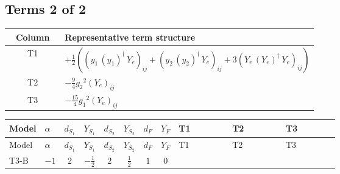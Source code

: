 \documentclass[8pt]{article}
\begin{document}
\begin{landscape}
\subsection*{Terms 2 of 2}
\begin{center}
\begin{tabular}{@{}c >{\raggedright\arraybackslash}p{0.82\linewidth}@{}}
\toprule
Column & Representative term structure \\
\midrule
T1 & \(\displaystyle +\frac{1}{2} (\left({y_1}\,\left({y_1}\right)^{\dagger}\,{Y_e}\right)_{ij}+\left({y_2}\,\left({y_2}\right)^{\dagger}\,{Y_e}\right)_{ij}+3 \left({Y_e}\,\left({Y_e}\right)^{\dagger}\,{Y_e}\right)_{ij})\) \\
\midrule
T2 & \(\displaystyle -\frac{9}{4} {g_2}^2 \left({Y_e}\right)_{ij}\) \\
\midrule
T3 & \(\displaystyle -\frac{15}{4} {g_1}^2 \left({Y_e}\right)_{ij}\) \\
\midrule
\bottomrule
\end{tabular}
\end{center}
\smallskip
\tiny
\begin{longtable}{@{}llcccccc >{\raggedright\arraybackslash}p{0.21\linewidth} >{\raggedright\arraybackslash}p{0.21\linewidth} >{\raggedright\arraybackslash}p{0.21\linewidth}@{}}
\toprule
Model & $\alpha$ & $d_{S_1}$ & $Y_{S_1}$ & $d_{S_2}$ & $Y_{S_2}$ & $d_F$ & $Y_F$ & T1 & T2 & T3 \\
\midrule
\endfirsthead
\toprule
Model & $\alpha$ & $d_{S_1}$ & $Y_{S_1}$ & $d_{S_2}$ & $Y_{S_2}$ & $d_F$ & $Y_F$ & T1 & T2 & T3 \\
\midrule
\endhead
T3-B & $-1$ & $2$ & $-\frac{1}{2}$ & $2$ & $\frac{1}{2}$ & $1$ & $0$ & \scriptsize\adjustbox{max width=\linewidth}{$\begin{gathered} +\frac{1}{2} (\left({y_1}\,\left({y_1}\right)^{\dagger}\,{Y_e}\right)_{ij}+\left({y_2}\,\left({y_2}\right)^{\dagger}\,{Y_e}\right)_{ij}+3 \left({Y_e}\,\left({Y_e}\right)^{\dagger}\,{Y_e}\right)_{ij})\end{gathered}$} & \scriptsize\adjustbox{max width=\linewidth}{$\begin{gathered} -\frac{9}{4} {g_2}^2 \left({Y_e}\right)_{ij}\end{gathered}$} & \scriptsize\adjustbox{max width=\linewidth}{$\begin{gathered} -\frac{15}{4} {g_1}^2 \left({Y_e}\right)_{ij}\end{gathered}$} \\
\midrule
\bottomrule
\end{longtable}
\clearpage

\end{landscape}
\end{document}
